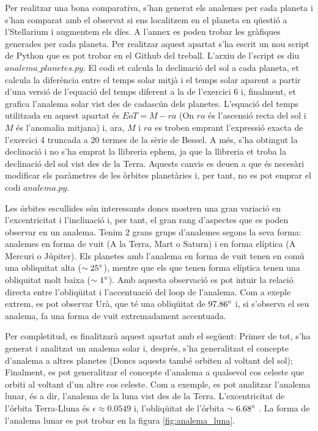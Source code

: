 \documentclass[a4paper, 11pt]{article}
\begin{document}
\noindent Per realitzar una bona comparativa, s'han generat els analemes per cada planeta i s'han comparat amb el observat si ens localitzem en el planeta en qüestió a l'Stellarium i augmentem els díes. A l'annex es poden trobar les gràfiques generades per cada planeta. Per realitzar aquest apartat s'ha escrit un nou script de Python que es pot trobar en el Github del treball. L'arxiu de l'script es diu $analema\_planetes.py$. El codi et calcula la declinació del sol a cada planeta, et calcula la diferència entre el temps solar mitjà i el temps solar aparent a partir d'una versió de l'equació del temps diferent a la de l'exercici 6 i, finalment, et grafica l'analema solar vist des de cadascún dels planetes. L'equació del temps utilitzada en aquest apartat és $EoT = M - ra$ (On $ra$ és l'ascensió recta del sol i $M$ és l'anomalia mitjana) i, ara, $M$ i $ra$ es troben emprant l'expressió exacta de l'exercici 4 truncada a 20 termes de la sèrie de Bessel. A més, s'ha obtingut la declinació i no s'ha emprat la llibreria ephem, ja que la llibreria et troba la declinació del sol vist des de la Terra. Aquests canvis es deuen a que és necesàri modificar els paràmetres de les òrbites planetàries i, per tant, no es pot emprar el codi $analema.py$.

\vspace{2mm}

\noindent Les órbites escullides són interessants doncs mostren una gran variació en l'excentricitat i l'inclinació i, per tant, el gran rang d'aspectes que es poden observar en un analema. Tenim 2 grans grups d'analemes segons la seva forma: analemes en forma de vuit (A la Terra, Mart o Saturn) i en forma elíptica (A Mercuri o Júpiter). Els planetes amb l'analema en forma de vuit tenen en comú una obliquitat alta ($\sim 25\degree$), mentre que els que tenen forma elíptica tenen una obliquitat molt baixa ($\sim 1\degree$). Amb aquesta observació es pot intuir la relació directa entre l'obliqüitat i l'accentuació del loop de l'analema. Com a exeple extrem, es pot observar Urà, que té una obliqüitat de $97.86 \degree$ i, si s'observa el seu analema, fa una forma de vuit extremadament accentuada. 

\vspace{2mm}

\noindent Per completitud, es finalitzarà aquest apartat amb el següent: Primer de tot, s'ha generat i analitzat un analema solar i, després, s'ha generalitzat el concepte d'analema a altres planetes (Doncs aquests també orbiten al voltant del sol); Finalment, es pot generalitzar el concepte d'analema a qualsevol cos celeste que orbiti al voltant d'un altre cos celeste. Com a exemple, es pot analitzar l'analema lunar, és a dir, l'analema de la luna vist des de la Terra. L'excentricitat de l'órbita Terra-Lluna és $\epsilon \approx 0.0549$ i, l'obliqüitat de l'órbita $\sim 6.68 \degree$ \cite{LLUNA}. La forma de l'analema lunar es pot trobar en la figura \ref{fig:analema_luna}.
\end{document}
